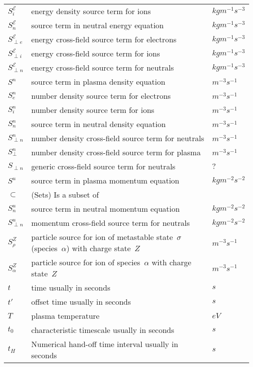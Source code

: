 \begin{longtable}{|p{3.0cm}|p{10.0cm}|p{3.0cm}|}
$S^{\mathcal{E}}_{i}$ & energy density source term for ions  & $kg m^{-1} s^{-3}$ \\
$S^\mathcal{E}_n$ & source term in neutral energy equation  & $kg m^{-1} s^{-3}$ \\
$S^\mathcal{E}_{\perp e}$ & energy cross-field source term for electrons  & $kg m^{-1} s^{-3}$ \\
$S^\mathcal{E}_{\perp i}$ & energy cross-field source term for ions   & $kg m^{-1} s^{-3}$ \\
$S^\mathcal{E}_{\perp n}$ & energy cross-field source term for neutrals  & $kg m^{-1} s^{-3}$ \\
$S^n$ & source term in plasma density equation  & $m^{-3} s^{-1}$ \\
$S^n_{e}$ & number density source term for electrons  & $m^{-3} s^{-1}$ \\
$S^n_{i}$ & number density source term for ions  & $m^{-3} s^{-1}$ \\
$S^n_n$ & source term in neutral density equation  & $m^{-3} s^{-1}$ \\
$S^n_{\perp n}$ & number density cross-field source term for neutrals  & $m^{-3} s^{-1}$ \\
$S^n_{\perp}$ & number density cross-field source term for plasma  & $m^{-3} s^{-1}$ \\
$S_{\perp n}$ & generic cross-field source term for neutrals  & $?$ \\
$S^u$ & source term in plasma momentum equation  & $kg m^{-2} s^{-2}$ \\
$\subset$ &  (Sets) Is a subset of & \\
$S^u_n$ & source term in neutral momentum equation   & $kg m^{-2} s^{-2}$ \\
$S^u_{\perp n}$ & momentum cross-field source term for neutrals  & $kg m^{-2} s^{-2}$ \\
$S^Z_\rho$ & particle source for ion of metastable state~$\sigma$ (species~$\alpha$) with charge state~$Z$  & $m^{-3} s^{-1}$ \\
$S^Z_\alpha$ & particle source for ion of species~$\alpha$ with charge state~$Z$  & $m^{-3} s^{-1}$ \\
$t$ & time usually in seconds  & $s$ \\
$t'$ & offset time usually in seconds  & $s$ \\
$T$ & plasma temperature  & $eV$ \\
$t_0$ & characteristic timescale usually in seconds  & $s$ \\
$t_H$ & Numerical hand-off time interval usually in seconds  & $s$ \\

\end{longtable}
